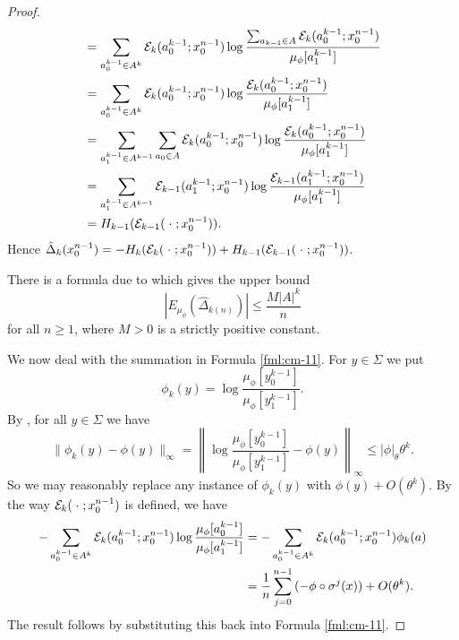 \begin{lemma}
\begin{proof}
\begin{align*}
				&= \sum_{a_0^{k - 1} \in A^k}\mathcal{E}_k(a_0^{k - 1}; x_0^{n - 1}) \log{\frac{\sum_{a_{k - 1} \in A}{\mathcal{E}_k(a_0^{k - 1}; x_0^{n - 1})}}{\mu_\phi[a_1^{k - 1}]}} \\
				&= \sum_{a_0^{k - 1} \in A^k}\mathcal{E}_k(a_0^{k - 1}; x_0^{n - 1}) \log{\frac{\mathcal{E}_k(a_0^{k - 1}; x_0^{n - 1})}{\mu_\phi[a_1^{k - 1}]}} \\
				&= \sum_{a_1^{k - 1} \in A^{k - 1}}\sum_{a_0 \in A}\mathcal{E}_k(a_0^{k - 1}; x_0^{n - 1}) \log{\frac{\mathcal{E}_k(a_0^{k - 1}; x_0^{n - 1})}{\mu_\phi[a_1^{k - 1}]}} \\
				&= \sum_{a_1^{k - 1} \in A^{k - 1}}\mathcal{E}_{k - 1}(a_1^{k - 1}; x_0^{n - 1}) \log{\frac{\mathcal{E}_{k - 1}(a_1^{k - 1}; x_0^{n - 1})}{\mu_\phi[a_1^{k - 1}]}} \\
				&= H_{k - 1}(\mathcal{E}_{k - 1}(\mathrel{}\cdot\mathrel{}; x_0^{n - 1})).
		\end{align*}
		Hence $\hat{\Delta}_k(x_0^{n - 1}) = -H_k(\mathcal{E}_k(\mathrel{}\cdot\mathrel{}; x_0^{n - 1})) + H_{k - 1}(\mathcal{E}_{k - 1}(\mathrel{}\cdot\mathrel{}; x_0^{n - 1}))$.
		
		There is a formula due to \cite[Formulae (4.15), (4.16)]{gabrielli-galves-guiol:fluctuations} which gives the upper bound
		\[
			|E_{\mu_\phi}(\hat{\Delta}_{k(n)})| \leq \frac{M|A|^k}{n}
		\]
		for all $n \geq 1$, where $M > 0$ is a strictly positive constant.
		
		We now deal with the summation in Formula \eqref{fml:cm-11}. For $y \in \Sigma$ we put
		\[
			\phi_k(y) = \log\frac{\mu_\phi[y_0^{k - 1}]}{\mu_\phi[y_1^{k - 1}]}.
		\]
		By , for all $y \in \Sigma$ we have
		\[
			\|\phi_k(y) - \phi(y)\|_\infty = \left\|\log\frac{\mu_\phi[y_0^{k - 1}]}{\mu_\phi[y_1^{k - 1}]} - \phi(y)\right\|_\infty \leq |\phi|_\theta \theta^k.
		\]
		So we may reasonably replace any instance of $\phi_k(y)$ with $\phi(y) + O(\theta^k)$. By the way $\mathcal{E}_k(\mathrel{}\cdot\mathrel{}; x_0^{n - 1})$ is defined, we have
		\begin{align*}
			-\sum_{a_0^{k - 1} \in A^k}\mathcal{E}_k(a_0^{k - 1}; x_0^{n - 1}) \log{\frac{\mu_\phi[a_0^{k - 1}]}{\mu_\phi[a_1^{k - 1}]}} &= -\sum_{a_0^{k - 1} \in A^k}\mathcal{E}_k(a_0^{k - 1}; x_0^{n - 1}) \phi_k(a) \\
				&= \frac{1}{n}\sum_{j = 0}^{n - 1}{(-\phi \circ \sigma^j(x))} + O(\theta^k).
		\end{align*}
		The result follows by substituting this back into Formula \eqref{fml:cm-11}.
	\end{proof}
\end{lemma}
